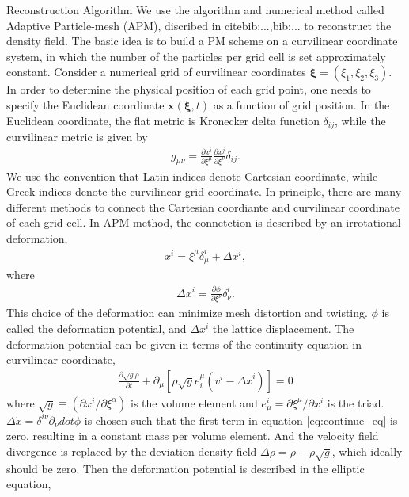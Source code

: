 \begin{section}{Reconstruction Algorithm}
  \label{sec:Reconstruction}
    We use the algorithm and numerical method called Adaptive Particle-mesh (APM), discribed in citebib:...,bib:... to reconstruct the density field. The basic idea is to build a PM scheme on a curvilinear coordinate system, in which the number of the particles per grid cell is set approximately constant. 
    Consider a numerical grid of curvilinear coordinates $\bm{\xi}=\left(\xi_1,\xi_2,\xi_3\right)$. In order to determine the physical position of each grid point, one needs to specify the Euclidean coordinate $\bm{x}(\bm{\xi},t)$ as a function of grid position. In the Euclidean coordinate, the flat metric is Kronecker delta function $\delta_{ij}$, while the curvilinear metric is given by
\begin{align}
    g_{\mu\nu}=\frac{\partial x^i}{\partial \xi ^\mu} \frac{\partial x^j}{\partial \xi ^\nu}\delta_{ij}.
\end{align}
    We use the convention that Latin indices denote Cartesian coordinate, while Greek indices denote the curvilinear grid coordinate.
    In principle, there are many different methods to connect the Cartesian coordiante and curvilinear coordinate of each grid cell. In APM method, the connetction is described by an irrotational deformation,
\begin{align}
    x^i=\xi ^\mu \delta ^i _\mu + \Delta x^i,
\end{align}
where
\begin{align}
 \label{eq:disp}
    \Delta x^i=\frac{\partial \phi}{\partial \xi ^ \nu}\delta ^i _\nu .
\end{align}
    This choice of the deformation can minimize mesh distortion and twisting. $\phi$ is called the deformation potential, and $\Delta x^i$ the lattice displacement. The deformation potential can be given in terms of the continuity equation in curvilinear coordinate,
\begin{align}
 \label{eq:continue_eq}
    \frac{\partial \sqrt{g} \rho }{\partial t}+\partial_\mu \left[\rho \sqrt{g} e^\mu _i \left(v^i - \Delta \dot{x}^i \right) \right] =0
\end{align}
where $\sqrt{g} \equiv (\partial x^i / \partial \xi ^ \alpha)$ is the volume element and $e^i _\mu = \partial \xi ^\mu / \partial x^i$ is the triad. $\Delta \dot{x}=\delta ^{i\nu}\partial _\nu dot{\phi}$ is chosen such that the first term in equation \ref{eq:continue_eq} is zero, resulting in a constant mass per volume element. And the velocity field divergence is replaced by the deviation density field $\Delta \rho = \bar{\rho}-\rho \sqrt{g}$, which ideally should be zero. Then the deformation potential is described in the elliptic equation,

\end{section}
